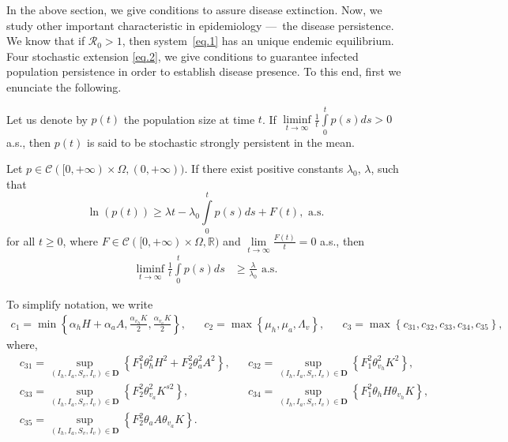	In the above section, we give conditions to assure disease extinction. 
Now, we study other important characteristic in epidemiology ---~the
disease persistence. We know that if $\mathcal{R}_{0}>1$, 
then system~\eqref{eq.1} has an unique endemic equilibrium. 
Four stochastic extension \eqref{eq.2}, we give conditions to guarantee 
infected population persistence in order to establish disease presence. 
To this end, first we enunciate the following.
\begin{definition} \label{def.pers}
	Let us denote by $p(t)$ the  population size at time $t$. 
	If
	$
		\liminf\limits_{t\rightarrow\infty}
		\frac{1}{t}
		\int\limits_{0}^{t}p(s)ds >0
	$
	 a.s., then $p(t)$ is said to be stochastic strongly persistent in the mean.
\end{definition}
%
\begin{lemma}[{\citet[Lemma 5.1]{Ji2014}}]\label{lem:log_Gronwall}
		Let $p\in \mathcal{C}([0,+\infty)\times\Omega,(0,+\infty))$. If there exist 
	positive constants 
	$
		\lambda_{0}
	$, 
	$
		\lambda
	$, such that 
	$$
		\ln(p(t))\geq 
			\lambda t - \lambda_{0}
			\int\limits_{0}^{t} 
				p(s)
			ds 
		+ 
		F(t),\text{ a.s.}
	$$
	for all $t\geq 0$, where 
	$
		F\in \mathcal{C}([0,+\infty)\times\Omega,\mathbb{R})
	$ 
	and 
	$
		\lim
			\limits_{t\to \infty}\frac{F(t)}{t}=0
	$ 
	a.s.,
	 then
	\begin{align*}\label{lem.marting}
		\liminf
		\limits_{t\rightarrow\infty}
			\frac{1}{t}
			\int\limits_{0}^{t}
				p(s)
			ds 
			&\geq 
				\frac{\lambda}{\lambda_{0}}\text{ a.s.}
	\end{align*}
\end{lemma}
To simplify notation, we write
\begin{align*}
	c_{1}= 
		\min
		\left\{
			\alpha_{h}H
			+\alpha_{a}A,
			\frac{\alpha_{v_{h}}K}{2},
			\frac{\alpha_{v_{a}}K}{2}
		\right\},
		&&
		c_{2}= 
			\max
			\left\{
				\mu_{h},
				\mu_{a}, 
				\Lambda_{v}
			\right\},
		&&
		c_{3}= 
			\max
				\left\{ 
					c_{31}, c_{32}, c_{33},
					c_{34}, c_{35} 
				\right\},
\end{align*}
where,
\begin{align*}
	&c_{31} = 
		\sup
			\limits_{(I_{h},I_{a},S_{v},I_{v})\in\mathbf{D}}
			\left\{
				F_{1}^{2}\theta_{h}^{2}H^{2}+F_{2}^{2}\theta_{a}^{2}A^{2}
			\right\}, 
	&&c_{32} = \sup\limits_{(I_{h},I_{a},S_{v},I_{v})\in\mathbf{D}}
		\left\{
			F_{1}^{2}\theta_{v_{h}}^{2}K^{2}
		\right\},\\
	&c_{33} = 
		\sup
			\limits_{(I_{h},I_{a},S_{v},I_{v})\in\mathbf{D}}
			\left\{
				F_{2}^{2}\theta_{v_{a}}^{2}K^{s2}
			\right\},
	&&c_{34} = 
		\sup
			\limits_{(I_{h},I_{a},S_{v},I_{v})\in\mathbf{D}}
			\left\{F_{1}^{2}\theta_{h}H\theta_{v_{h}}K\right\},\\
	&c_{35} = 
		\sup\limits_{(I_{h},I_{a},S_{v},I_{v})\in\mathbf{D}}
		\left\{
			F_{2}^{2}\theta_{a}A\theta_{v_{a}}K
		\right\}.
\end{align*}
